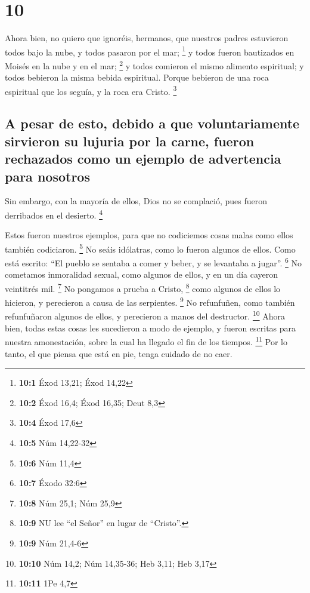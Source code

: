 \hypertarget{section-9}{%
\section{10}\label{section-9}}

 Ahora bien, no quiero que ignoréis, hermanos, que
nuestros padres estuvieron todos bajo la nube, y todos pasaron por el
mar; \footnote{\textbf{10:1} Éxod 13,21; Éxod 14,22}  y
todos fueron bautizados en Moisés en la nube y en el mar; \footnote{\textbf{10:2}
  Éxod 16,4; Éxod 16,35; Deut 8,3}  y todos comieron el
mismo alimento espiritual;  y todos bebieron la misma
bebida espiritual. Porque bebieron de una roca espiritual que los
seguía, y la roca era Cristo. \footnote{\textbf{10:4} Éxod 17,6}

\hypertarget{a-pesar-de-esto-debido-a-que-voluntariamente-sirvieron-su-lujuria-por-la-carne-fueron-rechazados-como-un-ejemplo-de-advertencia-para-nosotros}{%
\subsection{A pesar de esto, debido a que voluntariamente sirvieron su
lujuria por la carne, fueron rechazados como un ejemplo de advertencia
para
nosotros}\label{a-pesar-de-esto-debido-a-que-voluntariamente-sirvieron-su-lujuria-por-la-carne-fueron-rechazados-como-un-ejemplo-de-advertencia-para-nosotros}}

 Sin embargo, con la mayoría de ellos, Dios no se
complació, pues fueron derribados en el desierto. \footnote{\textbf{10:5}
  Núm 14,22-32}

 Estos fueron nuestros ejemplos, para que no codiciemos
cosas malas como ellos también codiciaron. \footnote{\textbf{10:6} Núm
  11,4}  No seáis idólatras, como lo fueron algunos de
ellos. Como está escrito: ``El pueblo se sentaba a comer y beber, y se
levantaba a jugar''. \footnote{\textbf{10:7} Éxodo 32:6} 
No cometamos inmoralidad sexual, como algunos de ellos, y en un día
cayeron veintitrés mil. \footnote{\textbf{10:8} Núm 25,1; Núm 25,9}
 No pongamos a prueba a Cristo, \footnote{\textbf{10:9} NU
  lee ``el Señor'' en lugar de ``Cristo''.} como algunos de ellos lo
hicieron, y perecieron a causa de las serpientes. \footnote{\textbf{10:9}
  Núm 21,4-6}  No refunfuñen, como también refunfuñaron
algunos de ellos, y perecieron a manos del destructor. \footnote{\textbf{10:10}
  Núm 14,2; Núm 14,35-36; Heb 3,11; Heb 3,17}  Ahora
bien, todas estas cosas les sucedieron a modo de ejemplo, y fueron
escritas para nuestra amonestación, sobre la cual ha llegado el fin de
los tiempos. \footnote{\textbf{10:11} 1Pe 4,7}  Por lo
tanto, el que piensa que está en pie, tenga cuidado de no caer.


